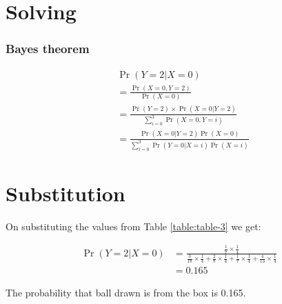\documentclass{beamer}
\providecommand{\pr}[1]{\ensuremath{\Pr\left(#1\right)}}
\begin{document}
\section{Solving}
\begin{frame}
\frametitle{Bayes theorem}

\begin{align}
    &\pr{Y=2|X=0} \\ 
	&= \frac{\pr{X=0,Y=2}}{\pr{X = 0}} \\
	&= \frac{\pr{Y=2}\times\pr{X=0|Y=2} }{\sum_{i=0}^3 \pr{X = 0, Y=i}} \\
	&= \frac{\pr{X = 0|Y = 2}\pr{X = 0}}{\sum_{i=0}^3 \pr{Y=0|X=i}\pr{X = i}}
\end{align}
\end{frame}

\section{Substitution}
\begin{frame}{}
On substituting the values from Table \eqref{table:table-3} we get:

\begin{align}
    \pr{Y=2|X=0} &= \frac{\frac{1}{7}\times\frac{1}{4}}{\frac{3}{18}\times\frac{1}{4} + \frac{2}{8}\times\frac{1}{4} + \frac{1}{7}\times\frac{1}{4} + \frac{4}{13}\times\frac{1}{4}}\\
&= 0.165
\end{align}

\begin{block}{}
The probability that ball drawn is from the box  is 0.165.
\end{block}

\end{frame}
\end{document}
